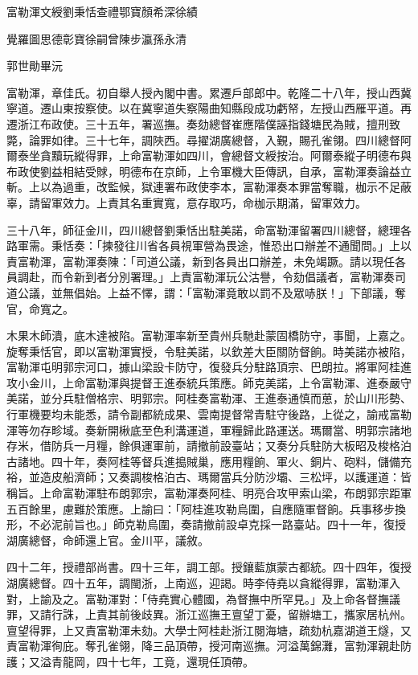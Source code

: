 
\begin{pinyinscope}
富勒渾文綬劉秉恬查禮鄂寶顏希深徐績

覺羅圖思德彰寶徐嗣曾陳步瀛孫永清

郭世勛畢沅

富勒渾，章佳氏。初自舉人授內閣中書。累遷戶部郎中。乾隆二十八年，授山西冀寧道。遷山東按察使。以在冀寧道失察陽曲知縣段成功虧帑，左授山西雁平道。再遷浙江布政使。三十五年，署巡撫。奏劾總督崔應階僕誣指錢塘民為賊，擅刑致斃，論罪如律。三十七年，調陜西。尋擢湖廣總督，入覲，賜孔雀翎。四川總督阿爾泰坐貪黷玩縱得罪，上命富勒渾如四川，會總督文綬按治。阿爾泰縱子明德布與布政使劉益相結受賕，明德布在京師，上令軍機大臣傳訊，自承，富勒渾奏論益立斬。上以為過重，改監候，獄連署布政使李本，富勒渾奏本罪當奪職，枷示不足蔽辜，請留軍效力。上責其名重實寬，意存取巧，命枷示期滿，留軍效力。

三十八年，師征金川，四川總督劉秉恬出駐美諾，命富勒渾留署四川總督，總理各路軍需。秉恬奏：「揀發往川省各員視軍營為畏途，惟恐出口辦差不通聞問。」上以責富勒渾，富勒渾奏陳：「司道公議，新到各員出口辦差，未免竭蹶。請以現任各員調赴，而令新到者分別署理。」上責富勒渾玩公沽譽，令劾倡議者，富勒渾奏司道公議，並無倡始。上益不懌，謂：「富勒渾竟敢以罰不及眾哧朕！」下部議，奪官，命寬之。

木果木師潰，底木達被陷。富勒渾率新至貴州兵馳赴蒙固橋防守，事聞，上嘉之。旋奪秉恬官，即以富勒渾實授，令駐美諾，以欽差大臣關防督餉。時美諾亦被陷，富勒渾屯明郭宗河口，據山梁設卡防守，復發兵分駐路頂宗、巴朗拉。將軍阿桂進攻小金川，上命富勒渾與提督王進泰統兵策應。師克美諾，上令富勒渾、進泰嚴守美諾，並分兵駐僧格宗、明郭宗。阿桂奏富勒渾、王進泰通慎而葸，於山川形勢、行軍機要均未能悉，請令副都統成果、雲南提督常青駐守後路，上從之，諭戒富勒渾等勿存畛域。奏新開楸底至色利溝運道，軍糧歸此路運送。瑪爾當、明郭宗諸地存米，借防兵一月糧，餘俱運軍前，請撤前設臺站；又奏分兵駐防大板昭及梭格泊古諸地。四十年，奏阿桂等督兵進搗賊巢，應用糧餉、軍火、銅片、砲料，儲備充裕，並造皮船濟師；又奏調梭格泊古、瑪爾當兵分防沙壩、三松坪，以護運道：皆稱旨。上命富勒渾駐布朗郭宗，富勒渾奏阿桂、明亮合攻甲索山梁，布朗郭宗距軍五百餘里，慮難於策應。上諭曰：「阿桂進攻勒烏圍，自應隨軍督餉。兵事移步換形，不必泥前旨也。」師克勒烏圍，奏請撤前設卓克採一路臺站。四十一年，復授湖廣總督，命師還上官。金川平，議敘。

四十二年，授禮部尚書。四十三年，調工部。授鑲藍旗蒙古都統。四十四年，復授湖廣總督。四十五年，調閩浙，上南巡，迎謁。時李侍堯以貪縱得罪，富勒渾入對，上諭及之。富勒渾對：「侍堯實心體國，為督撫中所罕見。」及上命各督撫議罪，又請行誅，上責其前後歧異。浙江巡撫王亶望丁憂，留辦塘工，攜家居杭州。亶望得罪，上又責富勒渾未劾。大學士阿桂赴浙江閱海塘，疏劾杭嘉湖道王燧，又責富勒渾徇庇。奪孔雀翎，降三品頂帶，授河南巡撫。河溢萬錦灘，富勃渾親赴防護；又溢青龍岡，四十七年，工竟，還現任頂帶。


\end{pinyinscope}
